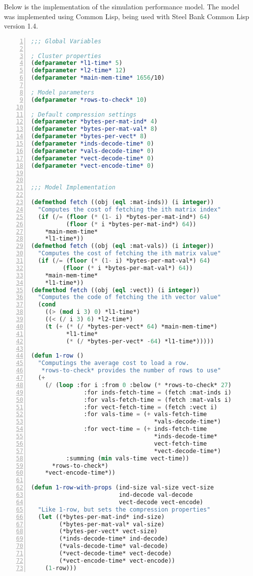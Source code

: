 Below is the implementation of the simulation performance model.
The model was implemented using Common Lisp, being used with Steel Bank Common Lisp version 1.4.

\begin{lstlisting}[language=Lisp,
					showstringspaces=false,
					numbers=left,
					numberstyle=\tiny]
;;; Global Variables

; Cluster properties
(defparameter *l1-time* 5)
(defparameter *l2-time* 12)
(defparameter *main-mem-time* 1656/10)

; Model parameters
(defparameter *rows-to-check* 10)

; Default compression settings
(defparameter *bytes-per-mat-ind* 4)
(defparameter *bytes-per-mat-val* 8)
(defparameter *bytes-per-vect* 8)
(defparameter *inds-decode-time* 0)
(defparameter *vals-decode-time* 0)
(defparameter *vect-decode-time* 0)
(defparameter *vect-encode-time* 0)


;;; Model Implementation

(defmethod fetch ((obj (eql :mat-inds)) (i integer))
  "Computes the cost of fetching the ith matrix index"
  (if (/= (floor (* (1- i) *bytes-per-mat-ind*) 64)
          (floor (* i *bytes-per-mat-ind*) 64))
    *main-mem-time*
    *l1-time*))
(defmethod fetch ((obj (eql :mat-vals)) (i integer))
  "Computes the cost of fetching the ith matrix value"
  (if (/= (floor (* (1- i) *bytes-per-mat-val*) 64)
         (floor (* i *bytes-per-mat-val*) 64))
    *main-mem-time*
    *l1-time*))
(defmethod fetch ((obj (eql :vect)) (i integer))
  "Computes the code of fetching the ith vector value"
  (cond
    ((> (mod i 3) 0) *l1-time*)
    ((< (/ i 3) 6) *l2-time*)
    (t (+ (* (/ *bytes-per-vect* 64) *main-mem-time*)
          *l1-time*
          (* (/ *bytes-per-vect* -64) *l1-time*)))))

(defun 1-row ()
  "Computings the average cost to load a row.
   *rows-to-check* provides the number of rows to use"
  (+
    (/ (loop :for i :from 0 :below (* *rows-to-check* 27)
               :for inds-fetch-time = (fetch :mat-inds i)
               :for vals-fetch-time = (fetch :mat-vals i)
               :for vect-fetch-time = (fetch :vect i)
               :for vals-time = (+ vals-fetch-time
                                   *vals-decode-time*)
               :for vect-time = (+ inds-fetch-time
                                   *inds-decode-time*
                                   vect-fetch-time
                                   *vect-decode-time*)
          :summing (min vals-time vect-time))
      *rows-to-check*)
    *vect-encode-time*))

(defun 1-row-with-props (ind-size val-size vect-size
                         ind-decode val-decode
                         vect-decode vect-encode)
  "Like 1-row, but sets the compression properties"
  (let ((*bytes-per-mat-ind* ind-size)
        (*bytes-per-mat-val* val-size)
        (*bytes-per-vect* vect-size)
        (*inds-decode-time* ind-decode)
        (*vals-decode-time* val-decode)
        (*vect-decode-time* vect-decode)
        (*vect-encode-time* vect-encode))
    (1-row)))

\end{lstlisting}